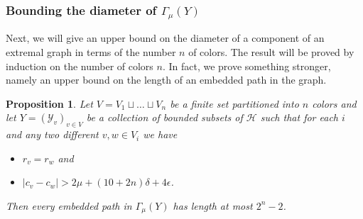 \documentclass[11pt,letterpaper]{amsart}
\newtheorem{proposition}[theorem]{Proposition}
\begin{document}
\subsubsection*{Bounding the diameter of $\Gamma_{\mu}(Y)$}
Next, we will give an upper bound on the diameter of a component of an extremal graph in terms of the number $n$ of colors. The result will be proved by induction on the number of colors $n$. In fact, we prove something stronger, namely an upper bound on the length of an embedded path in the graph. 
\begin{proposition}
\label{pathbound}
Let $V=V_1\sqcup\dots\sqcup V_n$ be a finite set partitioned into $n$ colors and let $Y=(\mathcal Y_v)_{v\in V}$ be a collection of bounded subsets of $\mathcal H$ such that for each $i$ and any two different $v,w\in V_i$ we have
\begin{itemize}
\item
$r_v=r_w$ and 
\item
$|c_v-c_w|>2\mu+(10+2n)\delta+4\epsilon$. 
\end{itemize}
Then every embedded path in $\Gamma_{\mu}(Y)$ has length at most $2^n-2$. 
\end{proposition}
\end{document}
